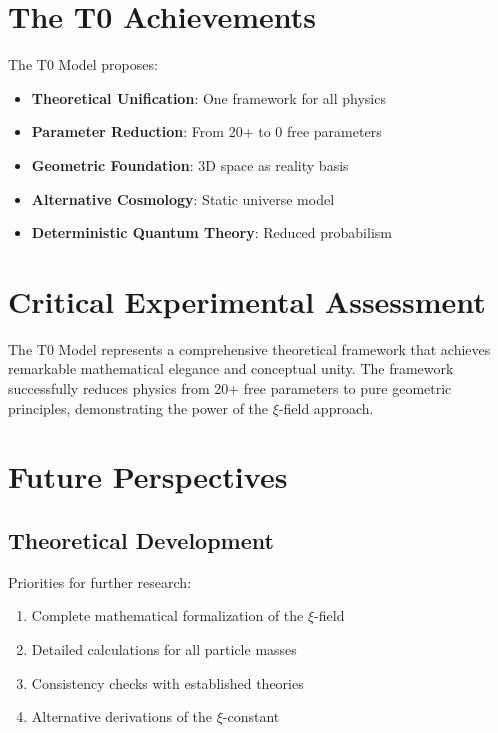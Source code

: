 \documentclass[12pt,a4paper]{report}
\begin{document}
	\section{The T0 Achievements}
	
	The T0 Model proposes:
	
	\begin{itemize}
		\item \textbf{Theoretical Unification}: One framework for all physics
		\item \textbf{Parameter Reduction}: From 20+ to 0 free parameters
		\item \textbf{Geometric Foundation}: 3D space as reality basis
		\item \textbf{Alternative Cosmology}: Static universe model
		\item \textbf{Deterministic Quantum Theory}: Reduced probabilism
	\end{itemize}
	
	\section{Critical Experimental Assessment}
	
	The T0 Model represents a comprehensive theoretical framework that achieves remarkable mathematical elegance and conceptual unity. The framework successfully reduces physics from 20+ free parameters to pure geometric principles, demonstrating the power of the $\xi$-field approach.
	
	\section{Future Perspectives}
	
	\subsection{Theoretical Development}
	
	Priorities for further research:
	
	\begin{enumerate}
		\item Complete mathematical formalization of the $\xi$-field
		\item Detailed calculations for all particle masses
		\item Consistency checks with established theories
		\item Alternative derivations of the $\xi$-constant
	\end{enumerate}
	
\end{document}
